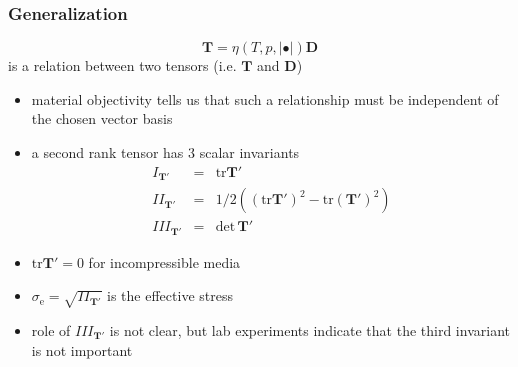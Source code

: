 \documentclass[hide notes,intlimits]{beamer}
\begin{document}

\begin{frame}
  \frametitle{Generalization}
  \begin{equation}
    \mathbf{T} = \eta\left(T,p,\vert \bullet \vert\right)\mathbf{D}
  \end{equation}
  is a relation between two tensors (i.e. $\mathbf{T}$ and $\mathbf{D}$)
  \begin{itemize}
  \item \alert{material objectivity} tells us that such a relationship must be independent of the chosen vector basis
  \item a second rank tensor has 3 scalar invariants
    \begin{eqnarray}
      I_{\mathbf{T}'} & = & \text{tr}\mathbf{T}' \\
      II_{\mathbf{T}'} & = & 1/2\left(\left(\text{tr}\mathbf{T}'\right)^{2}  -\text{tr}\left(\mathbf{T}'\right)^{2}\right)\\
      III_{\mathbf{T}'} & = & \text{det}\,\mathbf{T}'
    \end{eqnarray}
    \item $\text{tr}\mathbf{T}'=0$ for incompressible media
    \item $\sigma_{\text{e}} = \sqrt{II_{\mathbf{T}'}}$ is the \alert{effective stress}
    \item role of $ III_{\mathbf{T}'}$ is not clear, but lab experiments indicate that the third invariant is not important
  \end{itemize}
\end{frame}
\end{document}
